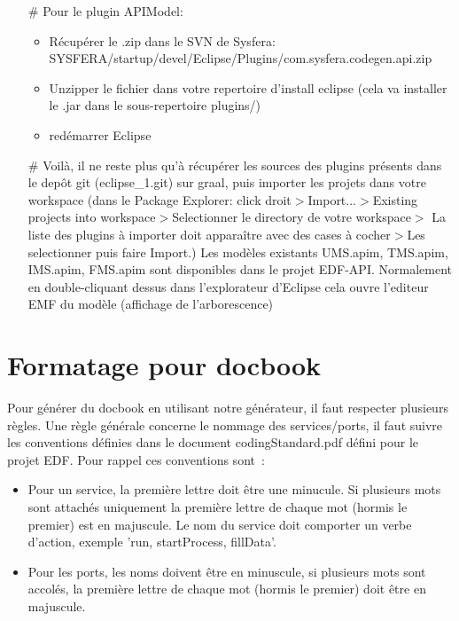 \documentclass{article}
\begin{document}
\begin{itemize}
\begin{itemize}
  \item[\#] Pour le plugin APIModel:
    \begin{itemize}
      \item R\'ecup\'erer le .zip dans le SVN de Sysfera: SYSFERA/startup/devel/Eclipse\-/Plugins/com.sysfera.codegen.api.zip
      \item Unzipper le fichier dans votre repertoire d'install eclipse (cela va installer le .jar dans le sous-repertoire plugins/)
      \item red\'emarrer Eclipse
    \end{itemize}
  \item[\#] Voil\`a, il ne reste plus qu'\`a r\'ecup\'erer les sources des plugins pr\'esents dans le depôt git (eclipse\_1.git) sur graal, puis importer les projets dans votre workspace (dans le Package Explorer: click droit$>$Import...$>$Existing projects into workspace$>$Selectionner le directory de votre workspace$>$ La liste des plugins \`a importer doit appara\^itre avec des cases \`a cocher$>$Les selectionner puis faire Import.) Les mod\`eles existants UMS.apim, TMS.apim, IMS.apim, FMS.apim sont disponibles dans le projet EDF-API. Normalement en double-cliquant dessus dans l'explorateur d'Eclipse cela ouvre l'editeur EMF du modèle (affichage de l'arborescence)
  \end{itemize}
\end{itemize}

\section*{Formatage pour docbook}
Pour g\'en\'erer du docbook en utilisant notre g\'en\'erateur, il faut respecter plusieurs r\`egles. 
Une r\`egle g\'en\'erale concerne le nommage des services/ports, il faut suivre les conventions d\'efinies dans le document codingStandard.pdf d\'efini pour le projet EDF. Pour rappel ces conventions sont~:
\begin{itemize}
\item Pour un service, la premi\`ere lettre doit \^etre une minucule. Si plusieurs mots sont attach\'es uniquement la premi\`ere lettre de chaque mot (hormis le premier) est en majuscule. Le nom du service doit comporter un verbe d'action, exemple 'run, startProcess, fillData'.
\item Pour les ports, les noms doivent \^etre en minuscule, si plusieurs mots sont accol\'es, la premi\`ere lettre de chaque mot (hormis le premier) doit \^etre en majuscule.
\end{itemize}
\end{document}
